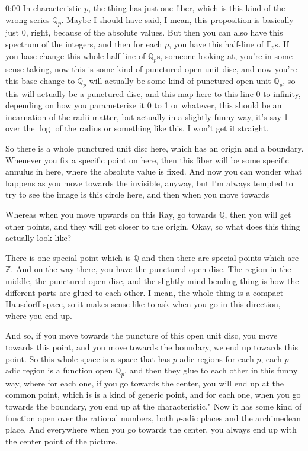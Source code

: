 \begin{unfinished}{0:00}
In characteristic $p$, the thing has just one fiber, which is this kind of the wrong series $\mathbb{Q}_p$. Maybe I should have said, I mean, this proposition is basically just 0, right, because of the absolute values. But then you can also have this spectrum of the integers, and then for each $p$, you have this half-line of $\mathbb{F}_p$s. If you base change this whole half-line of $\mathbb{Q}_p$s, someone looking at, you're in some sense taking, now this is some kind of punctured open unit disc, and now you're this base change to $\mathbb{Q}_p$ will actually be some kind of punctured open unit $\mathbb{Q}_p$, so this will actually be a punctured disc, and this map here to this line 0 to infinity, depending on how you parameterize it 0 to 1 or whatever, this should be an incarnation of the radii matter, but actually in a slightly funny way, it's say 1 over the $\log$ of the radius or something like this, I won't get it straight.

So there is a whole punctured unit disc here, which has an origin and a boundary. Whenever you fix a specific point on here, then this fiber will be some specific annulus in here, where the absolute value is fixed. And now you can wonder what happens as you move towards the invisible, anyway, but I'm always tempted to try to see the image is this circle here, and then when you move towards

Whereas when you move upwards on this Ray, go towards $\mathbb{Q}$, then you will get other points, and they will get closer to the origin. Okay, so what does this thing actually look like?

There is one special point which is $\mathbb{Q}$ and then there are special points which are $\mathbb{Z}$. And on the way there, you have the punctured open disc. The region in the middle, the punctured open disc, and the slightly mind-bending thing is how the different parts are glued to each other. I mean, the whole thing is a compact Hausdorff space, so it makes sense like to ask when you go in this direction, where you end up.

And so, if you move towards the puncture of this open unit disc, you move towards this point, and you move towards the boundary, we end up towards this point. So this whole space is a space that has $p$-adic regions for each $p$, each $p$-adic region is a function open $\mathbb{Q}_p$, and then they glue to each other in this funny way, where for each one, if you go towards the center, you will end up at the common point, which is is a kind of generic point, and for each one, when you go towards the boundary, you end up at the characteristic."
Now it has some kind of function open over the rational numbers, both $p$-adic places and the archimedean place. And everywhere when you go towards the center, you always end up with the center point of the picture.


\end{unfinished}
